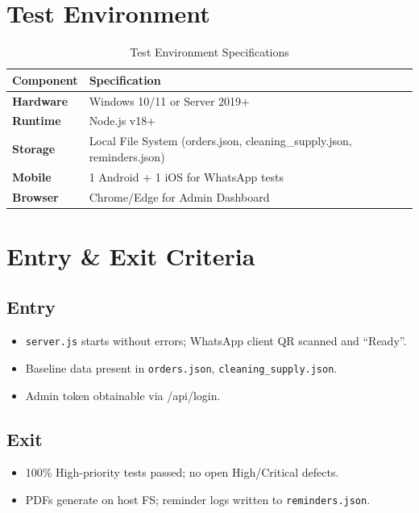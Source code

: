 ﻿\documentclass[11pt, a4paper]{article}
\begin{document}
\section{Test Environment}
\begin{table}[h]
    \centering
    \renewcommand{\arraystretch}{1.5}
    \begin{tabular}{|p{}|p{}|}
        \hline
        \rowcolor{headergray} \textbf{Component} & \textbf{Specification} \\
        \hline
        \textbf{Hardware} & Windows 10/11 or Server 2019+ \\
        \hline
        \textbf{Runtime} & Node.js v18+ \\
        \hline
        \textbf{Storage} & Local File System (orders.json, cleaning\_supply.json, reminders.json) \\
        \hline
        \textbf{Mobile} & 1 Android + 1 iOS for WhatsApp tests \\
        \hline
        \textbf{Browser} & Chrome/Edge for Admin Dashboard \\
        \hline
    \end{tabular}
    \caption{Test Environment Specifications}
\end{table}

\section{Entry \& Exit Criteria}
\subsection{Entry}
\begin{itemize}
    \item[$\square$] \texttt{server.js} starts without errors; WhatsApp client QR scanned and “Ready”.
    \item[$\square$] Baseline data present in \texttt{orders.json}, \texttt{cleaning\_supply.json}.
    \item[$\square$] Admin token obtainable via /api/login.
\end{itemize}

\subsection{Exit}
\begin{itemize}
    \item[$\square$] 100\% High-priority tests passed; no open High/Critical defects.
    \item[$\square$] PDFs generate on host FS; reminder logs written to \texttt{reminders.json}.
\end{itemize}
\end{document}
